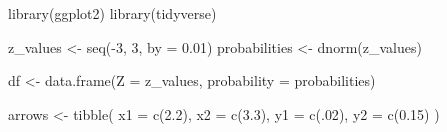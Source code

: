 \documentclass[
  b5paper,
  DIV=11,
  numbers=noendperiod]{scrreprt}
\newenvironment{Shaded}{\begin{snugshade}}{\end{snugshade}}
\newcommand{\AttributeTok}[1]{\textcolor[rgb]{0.40,0.45,0.13}{#1}}
\newcommand{\DecValTok}[1]{\textcolor[rgb]{0.68,0.00,0.00}{#1}}
\newcommand{\FloatTok}[1]{\textcolor[rgb]{0.68,0.00,0.00}{#1}}
\newcommand{\FunctionTok}[1]{\textcolor[rgb]{0.28,0.35,0.67}{#1}}
\newcommand{\NormalTok}[1]{\textcolor[rgb]{0.00,0.23,0.31}{#1}}
\newcommand{\OtherTok}[1]{\textcolor[rgb]{0.00,0.23,0.31}{#1}}
\newcommand{\SpecialCharTok}[1]{\textcolor[rgb]{0.37,0.37,0.37}{#1}}
\theoremstyle{definition}
\theoremstyle{remark}
\begin{document}
\begin{Shaded}
\begin{Highlighting}[]
\FunctionTok{library}\NormalTok{(ggplot2)}
\FunctionTok{library}\NormalTok{(tidyverse)}

\NormalTok{z\_values }\OtherTok{\textless{}{-}} \FunctionTok{seq}\NormalTok{(}\SpecialCharTok{{-}}\DecValTok{3}\NormalTok{, }\DecValTok{3}\NormalTok{, }\AttributeTok{by =} \FloatTok{0.01}\NormalTok{)}
\NormalTok{probabilities }\OtherTok{\textless{}{-}} \FunctionTok{dnorm}\NormalTok{(z\_values)}

\NormalTok{df }\OtherTok{\textless{}{-}} \FunctionTok{data.frame}\NormalTok{(}\AttributeTok{Z =}\NormalTok{ z\_values, }\AttributeTok{probability =}\NormalTok{ probabilities)}

\NormalTok{arrows }\OtherTok{\textless{}{-}} \FunctionTok{tibble}\NormalTok{(}
  \AttributeTok{x1 =} \FunctionTok{c}\NormalTok{(}\FloatTok{2.2}\NormalTok{), }
  \AttributeTok{x2 =} \FunctionTok{c}\NormalTok{(}\FloatTok{3.3}\NormalTok{),}
  \AttributeTok{y1 =} \FunctionTok{c}\NormalTok{(.}\DecValTok{02}\NormalTok{),}
  \AttributeTok{y2 =} \FunctionTok{c}\NormalTok{(}\FloatTok{0.15}\NormalTok{)}
\NormalTok{)}


\end{Highlighting}
\end{Shaded}
\end{document}
